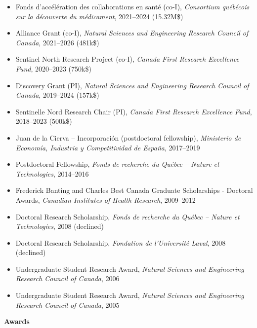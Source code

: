 \documentclass[11pt]{article}
\begin{document}
\begin{itemize}
  \item Fonds d'accélération des collaborations en santé (co-I), \textit{Consortium québécois sur la découverte du médicament}, 2021--2024 (15.32M\$)
  \item Alliance Grant (co-I), \textit{Natural Sciences and Engineering Research Council of Canada}, 2021--2026 (481k\$)
  \item Sentinel North Research Project (co-I), \textit{Canada First Research Excellence Fund}, 2020--2023 (750k\$)
  \item Discovery Grant (PI), \textit{Natural Sciences and Engineering Research Council of Canada}, 2019--2024 (157k\$)
  \item Sentinelle Nord Research Chair (PI), \textit{Canada First Research Excellence Fund}, 2018--2023 (500k\$)
  \item Juan de la Cierva -- Incorporaci\'on (postdoctoral fellowship), \textit{Ministerio de Econom\'ia, Industria y Competitividad de Espa\~{n}a}, 2017--2019
  \item Postdoctoral Fellowship, \textit{Fonds de recherche du Qu\'ebec -- Nature et Technologies}, 2014--2016
  \item Frederick Banting and Charles Best Canada Graduate Scholarships - Doctoral Awards, \textit{Canadian Institutes of Health Research}, 2009--2012
  \item Doctoral Research Scholarship, \textit{Fonds de recherche du Qu\'ebec -- Nature et Technologies}, 2008 (declined)
  \item Doctoral Research Scholarship, \textit{Fondation de l'Universit\'e Laval}, 2008 (declined)
  \item Undergraduate Student Research Award, \textit{Natural Sciences and Engineering Research Council of Canada}, 2006
  \item Undergraduate Student Research Award, \textit{Natural Sciences and Engineering Research Council of Canada}, 2005
\end{itemize}
%
%
%
\textbf{Awards}
%
\end{document}
